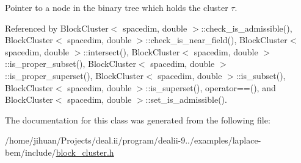 Pointer to a node in the binary tree which holds the cluster $\tau$. 

Referenced by Block\+Cluster$<$ spacedim, double $>$\+::check\+\_\+is\+\_\+admissible(), Block\+Cluster$<$ spacedim, double $>$\+::check\+\_\+is\+\_\+near\+\_\+field(), Block\+Cluster$<$ spacedim, double $>$\+::intersect(), Block\+Cluster$<$ spacedim, double $>$\+::is\+\_\+proper\+\_\+subset(), Block\+Cluster$<$ spacedim, double $>$\+::is\+\_\+proper\+\_\+superset(), Block\+Cluster$<$ spacedim, double $>$\+::is\+\_\+subset(), Block\+Cluster$<$ spacedim, double $>$\+::is\+\_\+superset(), operator==(), and Block\+Cluster$<$ spacedim, double $>$\+::set\+\_\+is\+\_\+admissible().



The documentation for this class was generated from the following file\+:\begin{DoxyCompactItemize}
\item 
/home/jihuan/\+Projects/deal.\+ii/program/dealii-\/9../examples/laplace-\/bem/include/\hyperlink{block__cluster_8h}{block\+\_\+cluster.\+h}\end{DoxyCompactItemize}
